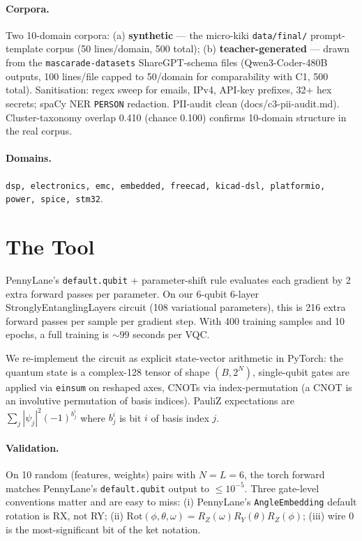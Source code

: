 \paragraph{Corpora.} Two 10-domain corpora: (a) \textbf{synthetic} --- the micro-kiki \texttt{data/final/} prompt-template corpus (50 lines/domain, 500 total); (b) \textbf{teacher-generated} --- drawn from the \texttt{mascarade-datasets} ShareGPT-schema files (Qwen3-Coder-480B outputs, 100 lines/file capped to 50/domain for comparability with C1, 500 total). Sanitisation: regex sweep for emails, IPv4, API-key prefixes, 32+ hex secrets; spaCy NER \texttt{PERSON} redaction. PII-audit clean (docs/c3-pii-audit.md). Cluster-taxonomy overlap 0.410 (chance 0.100) confirms 10-domain structure in the real corpus.

\paragraph{Domains.} \texttt{dsp, electronics, emc, embedded, freecad, kicad-dsl, platformio, power, spice, stm32}.

\section{The \torchvqc{} Tool}\label{sec:tool}

PennyLane's \texttt{default.qubit} + parameter-shift rule evaluates each gradient by 2 extra forward passes per parameter. On our 6-qubit 6-layer StronglyEntanglingLayers circuit (108 variational parameters), this is 216 extra forward passes per sample per gradient step. With 400 training samples and 10 epochs, a full training is $\sim$$99$ seconds per VQC.

We re-implement the circuit as explicit state-vector arithmetic in PyTorch: the quantum state is a complex-128 tensor of shape $(B, 2^N)$, single-qubit gates are applied via \texttt{einsum} on reshaped axes, CNOTs via index-permutation (a CNOT is an involutive permutation of basis indices). PauliZ expectations are $\sum_j |\psi_j|^2 (-1)^{b_j^i}$ where $b_j^i$ is bit $i$ of basis index $j$.

\paragraph{Validation.} On 10 random (features, weights) pairs with $N=L=6$, the torch forward matches PennyLane's \texttt{default.qubit} output to $\leq 10^{-5}$. Three gate-level conventions matter and are easy to miss: (i) PennyLane's \texttt{AngleEmbedding} default rotation is RX, not RY; (ii) $\mathrm{Rot}(\phi,\theta,\omega) = R_Z(\omega) R_Y(\theta) R_Z(\phi)$; (iii) wire 0 is the most-significant bit of the ket notation.


